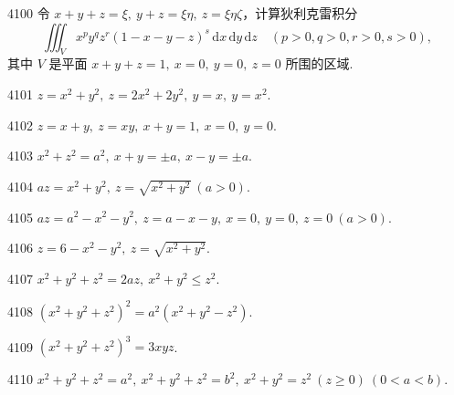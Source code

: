 \begin{prob}[M]{4100}
令 $x+y+z=\xi,\ y+z=\xi\eta,\ z=\xi\eta\zeta$，计算狄利克雷积分
\[
\iiint_{V} x^p y^q z^r (1-x-y-z)^s \,\mathrm{d}x\,\mathrm{d}y\,\mathrm{d}z \quad (p>0, q>0, r>0, s>0),
\]
其中 $V$ 是平面 $x+y+z=1,\ x=0,\ y=0,\ z=0$ 所围的区域.
\end{prob}



\begin{prob}[S]{4101}
$z=x^2+y^2,\ z=2x^2+2y^2,\ y=x,\ y=x^2$.
\end{prob}

\begin{prob}[S]{4102}
$z=x+y,\ z=xy,\ x+y=1,\ x=0,\ y=0$.
\end{prob}

\begin{prob}[S]{4103}
$x^2+z^2=a^2,\ x+y=\pm a,\ x-y=\pm a$.
\end{prob}

\begin{prob}[S]{4104}
$az=x^2+y^2,\ z=\sqrt{x^2+y^2}\ (a>0)$.
\end{prob}

\begin{prob}[S]{4105}
$az=a^2-x^2-y^2,\ z=a-x-y,\ x=0,\ y=0,\ z=0\ (a>0)$.
\end{prob}

\begin{prob}[S]{4106}
$z=6-x^2-y^2,\ z=\sqrt{x^2+y^2}$.
\end{prob}


\begin{prob}[S]{4107}
$x^2+y^2+z^2=2az,\ x^2+y^2 \leqslant z^2$.
\end{prob}

\begin{prob}[S]{4108}
$(x^2+y^2+z^2)^2 = a^2(x^2+y^2-z^2)$.
\end{prob}

\begin{prob}[S]{4109}
$(x^2+y^2+z^2)^3 = 3xyz$.
\end{prob}

\begin{prob}[S]{4110}
$x^2+y^2+z^2=a^2,\ x^2+y^2+z^2=b^2,\ x^2+y^2=z^2\ (z \geqslant 0)\ (0<a<b)$.
\end{prob}

